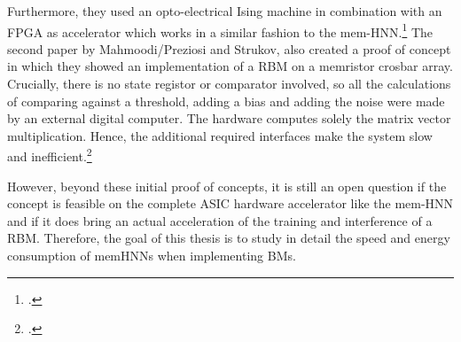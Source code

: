Furthermore, they used an opto-electrical Ising machine in combination with an \ac{FPGA} as accelerator which works in a similar fashion to the \ac{mem-HNN}.\footcite[cf.][1-11]{bohmNoiseinjectedAnalogIsing2022}
The second paper by Mahmoodi/Preziosi and Strukov, also created a proof of concept in which they showed an implementation of a \ac{RBM} on a memristor crosbar array.
Crucially, there is no state registor or comparator involved, so all the calculations of comparing against a threshold, adding a bias and adding the noise were made by an external digital computer. 
The hardware computes solely the matrix vector multiplication.
Hence, the additional required interfaces make the system slow and inefficient.\footcite[cf.][1-8]{mahmoodiVersatileStochasticDot2019}

However, beyond these initial proof of concepts, it is still an open question if the concept
is feasible on the complete \ac{ASIC} hardware accelerator like the \ac{mem-HNN} and if it does bring an actual acceleration of the training and interference of a \ac{RBM}.
Therefore, the goal of this thesis is to study in detail the speed and energy consumption of memHNNs when implementing BMs.